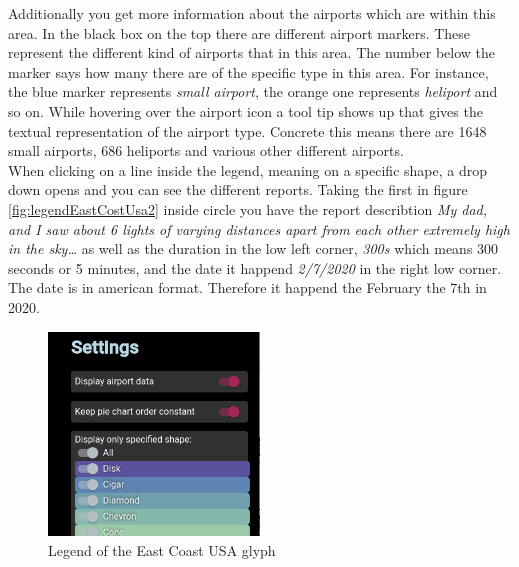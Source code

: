 \documentclass{article}
\begin{document}
Additionally you get more information about the airports which are within this area. In the 
black box on the top there are different airport markers. These represent the different kind of airports
that in this area. The number below the marker says how many there are of the specific type
in this area. For instance, the blue marker represents \textit{small airport}, the orange
one represents \textit{heliport} and so on. While hovering over the airport icon a tool tip
shows up that gives the textual representation of the airport type. Concrete this means there are 
1648 small airports, 686 heliports and various other different airports. 
\\
When clicking on a line inside the legend, meaning on a specific shape, a drop down opens and you
can see the different reports. Taking the first in figure \ref{fig:legendEastCostUsa2} inside circle
you have the report describtion 
\textit{My dad, and I saw about 6 lights of varying distances apart from each other extremely high in the sky…}
as well as the duration in the low left corner, \textit{300s} which means 300 seconds 
or 5 minutes, and the date it happend \textit{2/7/2020} in the right low corner. The date is in 
american format. Therefore it happend the February the 7th in 2020.
\\
\newpage
\begin{figure} 
    \centering
    \includegraphics[width=0.5\textwidth]{SettingsTap}
    \caption{Legend of the East Coast USA glyph}
    \label{fig:SettingsTap}
\end{figure}
\end{document}
